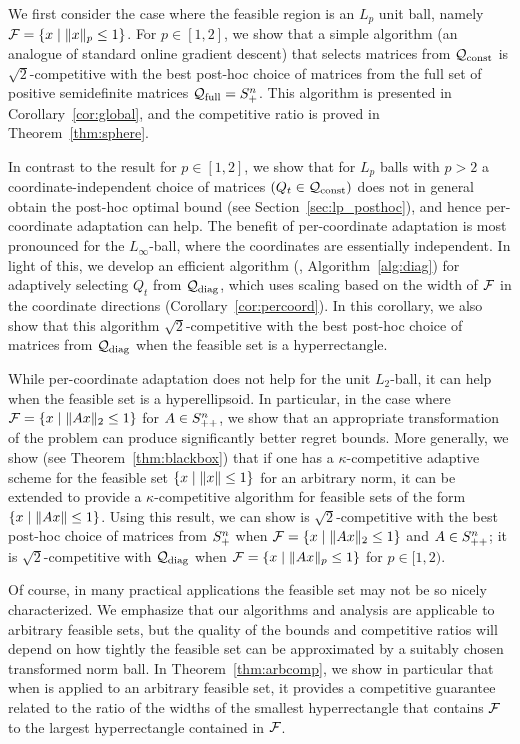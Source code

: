 We first consider the case where the feasible region is an $L_p$ unit
ball, namely $\mathcal{F} = \left\{x \mid \| x \|_p \leq 1\right\}$.  For $p \in [1, 2]$,
we show that a simple
algorithm (an analogue of standard online gradient descent) that
selects matrices from $\mathcal{Q}_{\text{const}}$ is $\sqrt{2}$-competitive with the
best post-hoc choice of matrices from the full set of positive
semidefinite matrices $\mathcal{Q}_{\text{full}} = S^n_{+}$.  
This algorithm is presented in
Corollary~\ref{cor:global}, and the competitive ratio is proved in
Theorem~\ref{thm:sphere}.

In contrast to the result for $p \in [1, 2]$, we show that for $L_p$
balls with $p > 2$ a coordinate-independent choice of matrices $(Q_t
\in \mathcal{Q}_{\text{const}})$ does not in general obtain the post-hoc optimal bound
(see Section~\ref{sec:lp_posthoc}), and hence per-coordinate
adaptation can help.  The benefit of per-coordinate adaptation is most
pronounced for the $L_\infty$-ball, where the coordinates are
essentially independent.  In light of this, we develop an efficient
algorithm (\FTPRLdiag, Algorithm~\ref{alg:diag}) for adaptively
selecting $Q_t$ from $\mathcal{Q}_{\text{diag}}$, which uses scaling based on the width
of $\mathcal{F}$ in the coordinate directions (Corollary~\ref{cor:percoord}).
In this corollary, we also show that this algorithm
$\sqrt{2}$-competitive with the best post-hoc choice of matrices from
$\mathcal{Q}_{\text{diag}}$ when the feasible set is a hyperrectangle.

While per-coordinate adaptation does not help for the
unit $L_2$-ball, it can help when the feasible set is a hyperellipsoid.
In particular, in the case where $\mathcal{F} = \left\{x
\mid \| A x \|_2 \leq 1\right\}$ for $A \in S^n_{++}$,
we show that an appropriate transformation of the problem can produce
significantly better regret bounds.
More generally, we show (see Theorem~\ref{thm:blackbox}) that if one
has a $\kappa$-competitive adaptive \FTPRL scheme for the feasible set
$\left\{x \mid \| x \| \leq 1\right\}$ for an arbitrary norm, it can be extended to
provide a $\kappa$-competitive algorithm for feasible sets
of the form $\left\{x \mid \| A x \| \leq 1\right\}$.  Using this result, we
can show
\FTPRLscale is $\sqrt{2}$-competitive with the
best post-hoc choice of matrices from $S^n_{+}$ when $\mathcal{F} = \left\{x \mid
\| A x \|_2 \leq 1\right\}$ and $A \in S^n_{++}$; it is $\sqrt{2}$-competitive
with $\mathcal{Q}_{\text{diag}}$ when $\mathcal{F} = \left\{x \mid \| A x \|_p \leq 1\right\}$ for $p \in
[1,2)$.

Of course, in many practical applications the feasible set may not be
so nicely characterized.  We emphasize that our algorithms and
analysis are applicable to arbitrary feasible sets, but the quality of
the bounds and competitive ratios will depend on how tightly the
feasible set can be approximated by a suitably chosen transformed norm
ball.  In Theorem~\ref{thm:arbcomp}, we show in particular that when
\FTPRLdiag is applied to an arbitrary feasible set, it provides a
competitive guarantee related to the ratio of the widths of the
smallest hyperrectangle that contains $\mathcal{F}$ to the largest
hyperrectangle contained in $\mathcal{F}$.


